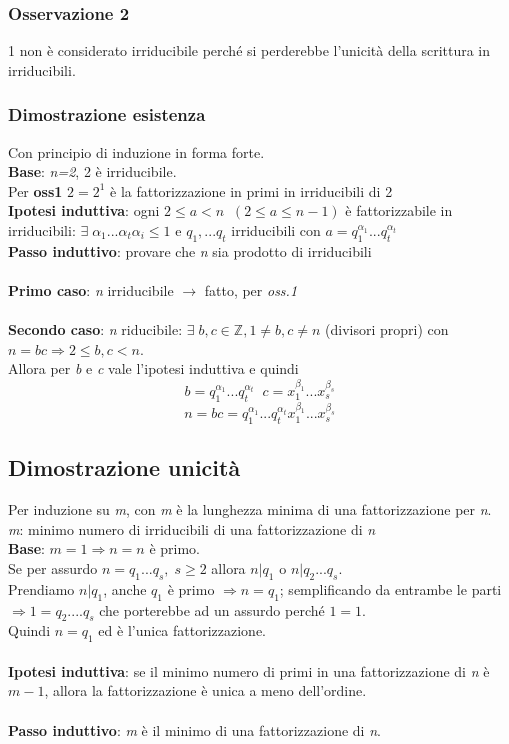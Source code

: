\subsubsection{Osservazione 2}
1 non è considerato irriducibile perché si perderebbe l'unicità della scrittura in irriducibili.

\subsubsection{Dimostrazione esistenza}
Con principio di induzione in forma forte.
\\
\textbf{Base}: \textit{n=2}, 2 è irriducibile.
\\
Per \textbf{oss1} \(2=2^1\) è la fattorizzazione in primi in irriducibili di 2
\\
\textbf{Ipotesi induttiva}: ogni \(2\leq a<n\;\;(2\leq a\leq n-1)\) è fattorizzabile in irriducibili: \(\exists\; \alpha _1...\alpha _t \alpha _i\leq 1\) e \(q_1,...q_t\) irriducibili con \(a=q^{\alpha _1}_1...q_t^{\alpha _t}\)
\\
\textbf{Passo induttivo}: provare che \textit{n} sia prodotto di irriducibili
\\\\
\textbf{Primo caso}: \textit{n} irriducibile \(\rightarrow\) fatto, per \textit{oss.1}
\\\\
\textbf{Secondo caso}: \textit{n} riducibile: \(\exists\;b,c\in\mathbb{Z}, 1\neq b, c\neq n\) (divisori propri) con \(n=bc\Rightarrow 2\leq b,c<n\).
\\
Allora per \textit{b} e \textit{c} vale l'ipotesi induttiva e quindi
\[b=q_1^{\alpha _1}...q_t^{\alpha _t}\;\; c= x_1^{\beta _1}...x_s^{\beta _s}\]
\[n=bc=q_1^{\alpha _1}...q_t^{\alpha _t} x_1^{\beta _1}...x_s^{\beta _s}\]

\subsection{Dimostrazione unicità}
Per induzione su \textit{m}, con \textit{m} è la lunghezza minima di una fattorizzazione per \textit{n}.
\\
\textit{m}: minimo numero di irriducibili di una fattorizzazione di \textit{n}
\\
\textbf{Base}: \(m=1\Rightarrow n=n\) è primo.
\\
Se per assurdo \(n=q_1...q_s,\; s\geq 2\) allora \(n|q_1\) o \(n|q_2...q_s\).
\\
Prendiamo \(n|q_1\), anche \(q_1\) è primo \(\Rightarrow n=q_1\); semplificando da entrambe le parti \(\Rightarrow 1=q_2....q_s\) che porterebbe ad un assurdo perché \(1=1\).
\\
Quindi \(n=q_1\) ed è l'unica fattorizzazione.
\\\\
\textbf{Ipotesi induttiva}: se il minimo numero di primi in una fattorizzazione di \textit{n} è \(m-1\), allora la fattorizzazione è unica a meno dell'ordine.
\\\\
\textbf{Passo induttivo}: \textit{m} è il minimo di una fattorizzazione di \textit{n}.

